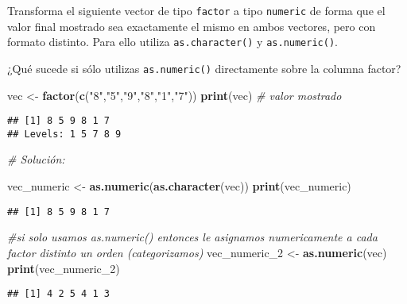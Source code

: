 \documentclass[]{article}
\newenvironment{Shaded}{\begin{snugshade}}{\end{snugshade}}
\newcommand{\CommentTok}[1]{\textcolor[rgb]{0.56,0.35,0.01}{\textit{#1}}}
\newcommand{\DecValTok}[1]{\textcolor[rgb]{0.00,0.00,0.81}{#1}}
\newcommand{\KeywordTok}[1]{\textcolor[rgb]{0.13,0.29,0.53}{\textbf{#1}}}
\newcommand{\NormalTok}[1]{#1}
\newcommand{\StringTok}[1]{\textcolor[rgb]{0.31,0.60,0.02}{#1}}
\begin{document}
Transforma el siguiente vector de tipo \texttt{factor} a tipo
\texttt{numeric} de forma que el valor final mostrado sea exactamente el
mismo en ambos vectores, pero con formato distinto. Para ello utiliza
\texttt{as.character()} y \texttt{as.numeric()}.

¿Qué sucede si sólo utilizas \texttt{as.numeric()} directamente sobre la
columna factor?

\begin{Shaded}
\begin{Highlighting}[]
\NormalTok{vec <-}\StringTok{ }\KeywordTok{factor}\NormalTok{(}\KeywordTok{c}\NormalTok{(}\StringTok{"8"}\NormalTok{,}\StringTok{"5"}\NormalTok{,}\StringTok{"9"}\NormalTok{,}\StringTok{"8"}\NormalTok{,}\StringTok{"1"}\NormalTok{,}\StringTok{"7"}\NormalTok{))}
\KeywordTok{print}\NormalTok{(vec) }\CommentTok{# valor mostrado}
\end{Highlighting}
\end{Shaded}

\begin{verbatim}
## [1] 8 5 9 8 1 7
## Levels: 1 5 7 8 9
\end{verbatim}

\begin{Shaded}
\begin{Highlighting}[]
\CommentTok{# Solución:}

\NormalTok{vec_numeric <-}\StringTok{ }\KeywordTok{as.numeric}\NormalTok{(}\KeywordTok{as.character}\NormalTok{(vec))}
\KeywordTok{print}\NormalTok{(vec_numeric)}
\end{Highlighting}
\end{Shaded}

\begin{verbatim}
## [1] 8 5 9 8 1 7
\end{verbatim}

\begin{Shaded}
\begin{Highlighting}[]
\CommentTok{#si solo usamos as.numeric() entonces le asignamos numericamente a cada factor distinto un orden (categorizamos)}
\NormalTok{vec_numeric_}\DecValTok{2}\NormalTok{ <-}\StringTok{ }\KeywordTok{as.numeric}\NormalTok{(vec)}
\KeywordTok{print}\NormalTok{(vec_numeric_}\DecValTok{2}\NormalTok{)}
\end{Highlighting}
\end{Shaded}

\begin{verbatim}
## [1] 4 2 5 4 1 3
\end{verbatim}
\end{document}
